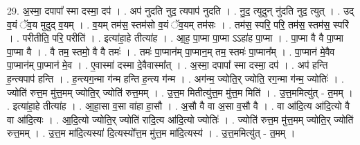 \documentclass[17pt]{extarticle}
\begin{document}
29. अ॒स्मा॒ दपापा᳚ स्मा दस्मा॒ दप॑ । . अप॑ नुदति नुद॒ त्यपाप॑ नुदति । . नु॒द॒ त्युदुन् नु॑दति नुद॒ त्युत् । . उद् व॒यं ॅव॒य मुदुद् व॒यम् । . व॒यम् तम॑स॒ स्तम॑सो व॒यं ॅव॒यम् तम॑सः । . तम॑स॒ स्परि॒ परि॒ तम॑स॒ स्तम॑स॒ स्परि॑ । . परीतीति॒ परि॒ परीति॑ । . इत्या॑हा॒हे तीत्या॑ह । . आ॒ह॒ पा॒प्मा पा॒प्मा ऽऽहा॑ह पा॒प्मा । . पा॒प्मा वै वै पा॒प्मा पा॒प्मा वै । . वै तम॒ स्तमो॒ वै वै तमः॑ । . तमः॑ पा॒प्मान॑म् पा॒प्मान॒म् तम॒ स्तमः॑ पा॒प्मान᳚म् । . पा॒प्मान॑ मे॒वैव पा॒प्मान॑म् पा॒प्मान॑ मे॒व । . ए॒वास्मा॑ दस्मा दे॒वैवास्मा᳚त् । . अ॒स्मा॒ दपापा᳚ स्मा दस्मा॒ दप॑ । . अप॑ हन्ति ह॒न्त्यपाप॑ हन्ति । . ह॒न्त्यग॒न्मा ग॑न्म हन्ति ह॒न्त्य ग॑न्म । . अग॑न्म॒ ज्योति॒र् ज्योति॒ रग॒न्मा ग॑न्म॒ ज्योतिः॑ । . ज्योति॑ रुत्त॒म मु॑त्त॒मम् ज्योति॒र् ज्योति॑ रुत्त॒मम् । . उ॒त्त॒म मितीत्यु॑त्त॒म मु॑त्त॒म मिति॑ । . उ॒त्त॒ममित्यु॑त् - त॒मम् । . इत्या॑हा॒हे तीत्या॑ह । . आ॒हा॒सा व॒सा वा॑हा हा॒सौ । . अ॒सौ वै वा अ॒सा व॒सौ वै । . वा आ॑दि॒त्य आ॑दि॒त्यो वै वा आ॑दि॒त्यः । . आ॒दि॒त्यो ज्योति॒र् ज्योति॑ रादि॒त्य आ॑दि॒त्यो ज्योतिः॑ । . ज्योति॑ रुत्त॒म मु॑त्त॒मम् ज्योति॒र् ज्योति॑ रुत्त॒मम् । . उ॒त्त॒म मा॑दि॒त्यस्या॑ दि॒त्यस्यो᳚त्त॒म मु॑त्त॒म मा॑दि॒त्यस्य॑ । . उ॒त्त॒ममित्यु॑त् - त॒मम् । \newline
\end{document}
